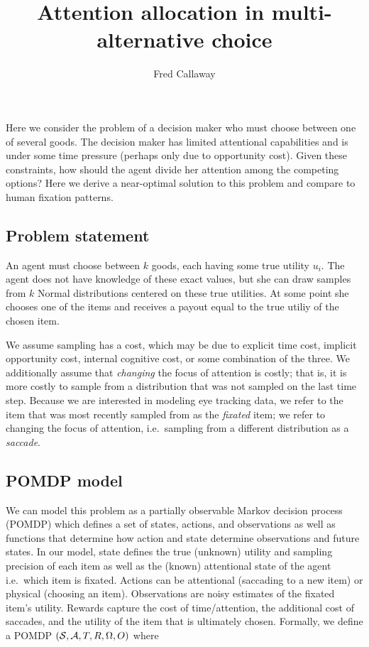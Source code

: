 \documentclass[12pt,a4paperpaper,]{article}
\title{\vspace{-2em}Attention allocation in multi-alternative choice}
\author{\vspace{-1em}Fred Callaway}
\date{\vspace{-1em}}
\begin{document}
\maketitle




Here we consider the problem of a decision maker who must choose between
one of several goods. The decision maker has limited attentional
capabilities and is under some time pressure (perhaps only due to
opportunity cost). Given these constraints, how should the agent divide
her attention among the competing options? Here we derive a near-optimal
solution to this problem and compare to human fixation patterns.

\subsection{Problem statement}\label{problem-statement}

An agent must choose between \(k\) goods, each having some true utility
\(u_i\). The agent does not have knowledge of these exact values, but
she can draw samples from \(k\) Normal distributions centered on these
true utilities. At some point she chooses one of the items and receives
a payout equal to the true utiliy of the chosen item.

We assume sampling has a cost, which may be due to explicit time cost,
implicit opportunity cost, internal cognitive cost, or some combination
of the three. We additionally assume that \emph{changing} the focus of
attention is costly; that is, it is more costly to sample from a
distribution that was not sampled on the last time step. Because we are
interested in modeling eye tracking data, we refer to the item that was
most recently sampled from as the \emph{fixated} item; we refer to
changing the focus of attention, i.e.~sampling from a different
distribution as a \emph{saccade}.

\subsection{POMDP model}\label{pomdp-model}

We can model this problem as a partially observable Markov decision
process (POMDP) which defines a set of states, actions, and observations
as well as functions that determine how action and state determine
observations and future states. In our model, state defines the true
(unknown) utility and sampling precision of each item as well as the
(known) attentional state of the agent i.e.~which item is fixated.
Actions can be attentional (saccading to a new item) or physical
(choosing an item). Observations are noisy estimates of the fixated
item's utility. Rewards capture the cost of time/attention, the
additional cost of saccades, and the utility of the item that is
ultimately chosen. Formally, we define a POMDP
\((\mathcal{S}, \mathcal{A}, T, R, \Omega, O)\) where
\end{document}

